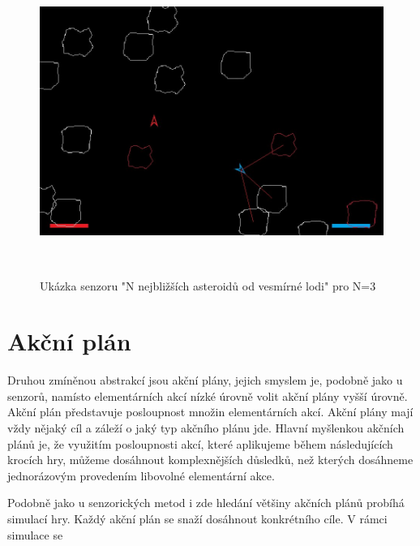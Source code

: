 \begin{figure}[hp]

\includegraphics[width=150mm, height=100mm]{./Obrazky/N_nearest_asteroids.png}
\caption{Ukázka senzoru "N nejbližších asteroidů od vesmírné lodi" pro N=3}
\label{obr02:}
\end{figure}


\section{Akční plán}
Druhou zmíněnou abstrakcí jsou akční plány, jejich smyslem je, podobně jako u senzorů, namísto elementárních akcí nízké úrovně volit akční plány vyšší úrovně.
Akční plán představuje posloupnost množin elementárních akcí. Akční plány mají vždy nějaký cíl a záleží o jaký typ akčního plánu jde. 
Hlavní myšlenkou akčních plánů je, že využitím posloupnosti akcí, které aplikujeme během následujících krocích hry, můžeme dosáhnout komplexnějších důsledků, než kterých dosáhneme jednorázovým provedením libovolné elementární akce.
\par
Podobně jako u senzorických metod i zde hledání většiny akčních plánů probíhá simulací hry. Každý akční plán se snaží dosáhnout konkrétního cíle. V rámci simulace se 

